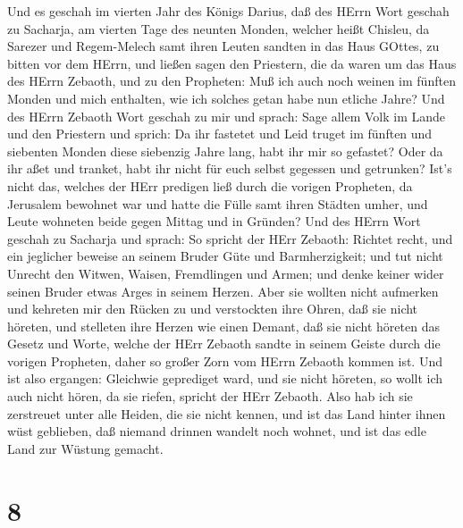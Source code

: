  Und es geschah im vierten Jahr des Königs Darius, daß des
HErrn Wort geschah zu Sacharja, am vierten Tage des neunten Monden,
welcher heißt Chisleu,  da Sarezer und Regem-Melech samt
ihren Leuten sandten in das Haus GOttes, zu bitten vor dem HErrn,
 und ließen sagen den Priestern, die da waren um das Haus
des HErrn Zebaoth, und zu den Propheten: Muß ich auch noch weinen im
fünften Monden und mich enthalten, wie ich solches getan habe nun
etliche Jahre?  Und des HErrn Zebaoth Wort geschah zu mir
und sprach:  Sage allem Volk im Lande und den Priestern und
sprich: Da ihr fastetet und Leid truget im fünften und siebenten Monden
diese siebenzig Jahre lang, habt ihr mir so gefastet?  Oder
da ihr aßet und tranket, habt ihr nicht für euch selbst gegessen und
getrunken?  Ist's nicht das, welches der HErr predigen ließ
durch die vorigen Propheten, da Jerusalem bewohnet war und hatte die
Fülle samt ihren Städten umher, und Leute wohneten beide gegen Mittag
und in Gründen?  Und des HErrn Wort geschah zu Sacharja und
sprach:  So spricht der HErr Zebaoth: Richtet recht, und ein
jeglicher beweise an seinem Bruder Güte und Barmherzigkeit;
 und tut nicht Unrecht den Witwen, Waisen, Fremdlingen und
Armen; und denke keiner wider seinen Bruder etwas Arges in seinem
Herzen.  Aber sie wollten nicht aufmerken und kehreten mir
den Rücken zu und verstockten ihre Ohren, daß sie nicht höreten,
 und stelleten ihre Herzen wie einen Demant, daß sie nicht
höreten das Gesetz und Worte, welche der HErr Zebaoth sandte in seinem
Geiste durch die vorigen Propheten, daher so großer Zorn vom HErrn
Zebaoth kommen ist.  Und ist also ergangen: Gleichwie
geprediget ward, und sie nicht höreten, so wollt ich auch nicht hören,
da sie riefen, spricht der HErr Zebaoth.  Also hab ich sie
zerstreuet unter alle Heiden, die sie nicht kennen, und ist das Land
hinter ihnen wüst geblieben, daß niemand drinnen wandelt noch wohnet,
und ist das edle Land zur Wüstung gemacht.

\hypertarget{section-7}{%
\section{8}\label{section-7}}


